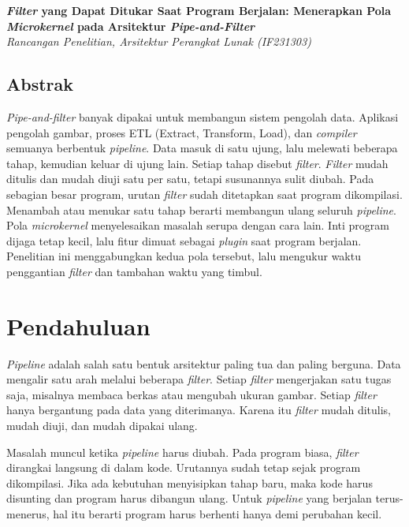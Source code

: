 \documentclass[11pt,a4paper]{article}
\begin{document}
\begin{center}
  {\LARGE\bfseries \textit{Filter} yang Dapat Ditukar Saat Program Berjalan: Menerapkan Pola \textit{Microkernel} pada Arsitektur \textit{Pipe-and-Filter}}\\[0.6em]
  {\small\itshape Rancangan Penelitian, Arsitektur Perangkat Lunak (IF231303)}
\end{center}

\vspace{1em}

\subsection*{Abstrak}

\textit{Pipe-and-filter} banyak dipakai untuk membangun sistem pengolah data. Aplikasi pengolah gambar, proses ETL (Extract, Transform, Load), dan \textit{compiler} semuanya berbentuk \textit{pipeline}. Data masuk di satu ujung, lalu melewati beberapa tahap, kemudian keluar di ujung lain. Setiap tahap disebut \textit{filter}. \textit{Filter} mudah ditulis dan mudah diuji satu per satu, tetapi susunannya sulit diubah. Pada sebagian besar program, urutan \textit{filter} sudah ditetapkan saat program dikompilasi. Menambah atau menukar satu tahap berarti membangun ulang seluruh \textit{pipeline}. Pola \textit{microkernel} menyelesaikan masalah serupa dengan cara lain. Inti program dijaga tetap kecil, lalu fitur dimuat sebagai \textit{plugin} saat program berjalan. Penelitian ini menggabungkan kedua pola tersebut, lalu mengukur waktu penggantian \textit{filter} dan tambahan waktu yang timbul.

\section{Pendahuluan}

\textit{Pipeline} adalah salah satu bentuk arsitektur paling tua dan paling berguna. Data mengalir satu arah melalui beberapa \textit{filter}. Setiap \textit{filter} mengerjakan satu tugas saja, misalnya membaca berkas atau mengubah ukuran gambar. Setiap \textit{filter} hanya bergantung pada data yang diterimanya. Karena itu \textit{filter} mudah ditulis, mudah diuji, dan mudah dipakai ulang.

Masalah muncul ketika \textit{pipeline} harus diubah. Pada program biasa, \textit{filter} dirangkai langsung di dalam kode. Urutannya sudah tetap sejak program dikompilasi. Jika ada kebutuhan menyisipkan tahap baru, maka kode harus disunting dan program harus dibangun ulang. Untuk \textit{pipeline} yang berjalan terus-menerus, hal itu berarti program harus berhenti hanya demi perubahan kecil.
\end{document}
